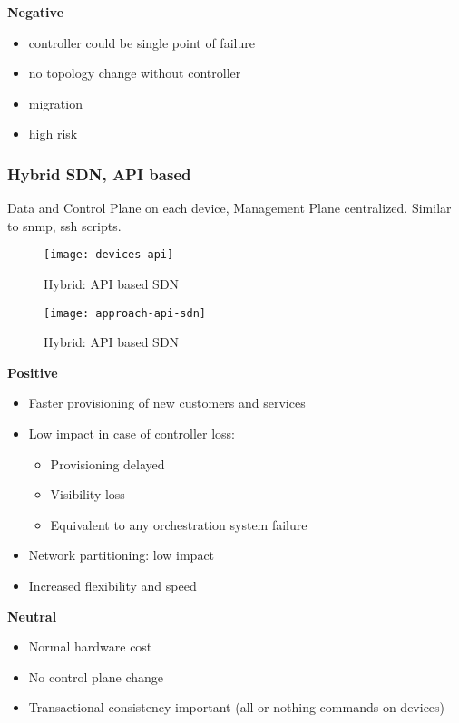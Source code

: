 \noindent
\textbf{Negative}
\begin{itemize}
	\item controller could be single point of failure 
	\item no topology change without controller 
	\item migration
	\item high risk
\end{itemize} 


\subsubsection{Hybrid SDN, API based}
Data and Control Plane on each device, Management Plane centralized. Similar to snmp, ssh scripts. 

\begin{figure}[h]
	\centering
	\texttt{[image: devices-api]}
	\caption{Hybrid: API based SDN}
\end{figure}

\begin{figure}[h]
	\centering
	\texttt{[image: approach-api-sdn]}
	\caption{Hybrid: API based SDN}
\end{figure}

\noindent
\textbf{Positive}
\begin{itemize}
	\item Faster provisioning of new customers and services 
    \item Low impact in case of controller loss: 
	\begin{itemize}
        \item Provisioning delayed
        \item Visibility loss 
		\item Equivalent to any orchestration system failure 
	\end{itemize}
	\item Network partitioning: low impact 
	\item Increased flexibility and speed 
\end{itemize}

\noindent
\textbf{Neutral}
\begin{itemize}
\item Normal hardware cost 
\item No control plane change 
\item Transactional consistency important (all or nothing commands on devices)  
\end{itemize}


